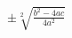 \documentclass[preview]{standalone}
\begin{document}
\begin{align*}
\pm \sqrt[2]{\frac{{b}^{2} - 4 a c}{4 {a}^{2}}}
\end{align*}
\end{document}

